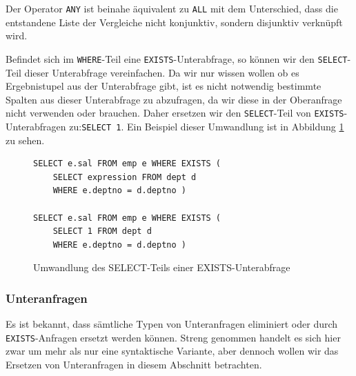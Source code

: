 Der Operator \verb|ANY| ist beinahe äquivalent zu \verb|ALL| mit dem Unterschied, dass die entstandene Liste der Vergleiche nicht konjunktiv, sondern disjunktiv verknüpft wird.

Befindet sich im \verb|WHERE|-Teil eine \verb|EXISTS|-Unterabfrage, so können wir den \verb|SELECT|-Teil dieser Unterabfrage vereinfachen. Da wir nur wissen wollen ob es Ergebnistupel aus der Unterabfrage gibt, ist es nicht notwendig bestimmte Spalten aus dieser Unterabfrage zu abzufragen, da wir diese in der Oberanfrage nicht verwenden oder brauchen. Daher ersetzen wir den \verb|SELECT|-Teil von \verb|EXISTS|-Unterabfragen zu:\verb|SELECT 1|. Ein Beispiel dieser Umwandlung ist in Abbildung \ref{fig:exists_ex1} zu sehen.

\begin{figure}[h]
\begin{verbatim}
SELECT e.sal FROM emp e WHERE EXISTS (
    SELECT expression FROM dept d 
    WHERE e.deptno = d.deptno )
    
SELECT e.sal FROM emp e WHERE EXISTS (
    SELECT 1 FROM dept d 
    WHERE e.deptno = d.deptno )
\end{verbatim}
\caption{Umwandlung des SELECT-Teils einer EXISTS-Unterabfrage}
\label{fig:exists_ex1}
\end{figure}



\subsubsection*{Unteranfragen}

Es ist bekannt, dass sämtliche Typen von Unteranfragen eliminiert oder durch \verb|EXISTS|-Anfragen ersetzt werden können. Streng genommen handelt es sich hier zwar um mehr als nur eine syntaktische Variante, aber dennoch wollen wir das Ersetzen von Unteranfragen in diesem Abschnitt betrachten.

